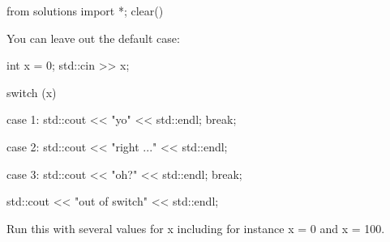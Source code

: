 \begin{python0}
from solutions import *; clear()
\end{python0}

You can leave out the default case:
\begin{console}
int x = 0;
std::cin >> x;

switch (x)
{
     case 1:
          std::cout << "yo" << std::endl;
          break;
          
     case 2:
          std::cout << "right ..." << std::endl;

     case 3:
          std::cout << "oh?" << std::endl;
          break;
}
std::cout << "out of switch" << std::endl;
\end{console}

Run this with several values for x including for instance x = 0 and x =
100.

